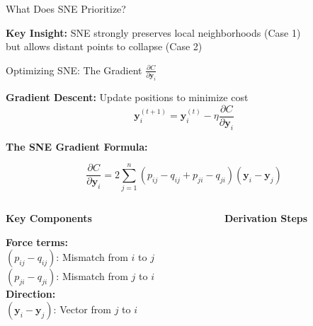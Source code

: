 \documentclass{beamer}
\begin{document}
\begin{frame}{What Does SNE Prioritize?}
\vspace{0.3cm}
\begin{center}
\colorbox{upcblue!10}{
\begin{minipage}{0.85\textwidth}
\centering
\footnotesize\textbf{Key Insight:} SNE strongly preserves local neighborhoods (Case 1)\\
\footnotesize but allows distant points to collapse (Case 2)
\end{minipage}
}
\end{center}
\end{frame}


\begin{frame}{Optimizing SNE: The Gradient $\frac{\partial C}{\partial \mathbf{y}_i}$}
\vspace{-0.2cm}

\begin{center}
\colorbox{upcblue!10}{
\begin{minipage}{0.85\textwidth}
\centering
\textbf{Gradient Descent:} Update positions to minimize cost\\
$$\mathbf{y}_i^{(t+1)} = \mathbf{y}_i^{(t)} - \eta \frac{\partial C}{\partial \mathbf{y}_i}$$
\end{minipage}
}
\end{center}

\vspace{0.3cm}
\textbf{\color{upcblue}The SNE Gradient Formula:}

$$\frac{\partial C}{\partial \mathbf{y}_i} = 2 \sum_{j=1}^{n} (p_{ij} - q_{ij} + p_{ji} - q_{ji})(\mathbf{y}_i - \mathbf{y}_j)$$

\vspace{0.2cm}
\begin{columns}[T]
\begin{column}{0.48\textwidth}
\textbf{Key Components}
\vspace{0.1cm}

\footnotesize
\textbf{Force terms:}\\
$(p_{ij} - q_{ij})$: Mismatch from $i$ to $j$\\
$(p_{ji} - q_{ji})$: Mismatch from $j$ to $i$\\

\vspace{0.2cm}
\textbf{Direction:}\\
$(\mathbf{y}_i - \mathbf{y}_j)$: Vector from $j$ to $i$
\end{column}

\begin{column}{0.48\textwidth}
\textbf{Derivation Steps}
\vspace{0.1cm}


\end{column}
\end{columns}
\end{frame}
\end{document}
